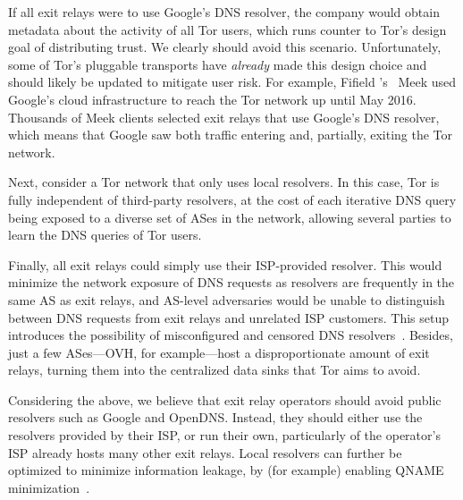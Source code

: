 If all exit relays were to use Google's DNS resolver, the company would
obtain metadata about the activity of all Tor users, which runs counter to
Tor's design goal of distributing trust.  We clearly should avoid this
scenario. Unfortunately, some of Tor's pluggable transports
have {\em already} made this design choice and should likely be updated
to mitigate user risk.  For example, Fifield \ea's~\cite{Fifield2015a}
Meek used Google's cloud infrastructure
to reach the Tor network up until May 2016.
Thousands of Meek clients
selected exit relays that use Google's DNS resolver, which means that Google
saw both traffic entering and, partially, exiting the Tor network.

Next, consider a Tor network that only uses local resolvers.  In this
case, Tor is fully independent of third-party resolvers, at the cost of
each iterative DNS query being exposed to a diverse set of ASes in the
network, allowing several parties to learn the DNS queries of Tor users.

Finally, all exit
relays could simply use their ISP-provided resolver.  This would minimize the
network exposure of DNS requests as resolvers are frequently in the same AS as
exit relays, and AS-level adversaries would be unable to distinguish
between DNS requests from exit relays and unrelated ISP customers.  This
setup introduces the possibility of misconfigured and censored DNS
resolvers~\cite[\S~4.1]{Winter2014b}.  Besides, just a few ASes---OVH, for
example---host a disproportionate amount of exit relays, turning them into the
centralized data sinks that Tor aims to avoid.

Considering the above, we believe that exit relay operators should avoid
public resolvers such as Google and OpenDNS.  Instead, they should
either use the resolvers provided by their ISP, or run their own,
particularly of the operator's
ISP already hosts many other exit relays.  Local
resolvers can further be optimized to minimize information leakage,
by (for example) enabling QNAME minimization~\cite{qname-minimization}.

